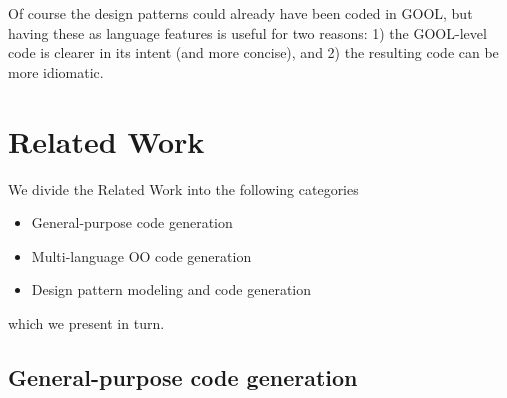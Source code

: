 \documentclass[sigplan,review,prologue,dvipsnames]{acmart}
\begin{document}
Of course the design patterns could already have been coded in GOOL, but
having these as language features is useful for two reasons: 1) the GOOL-level
code is clearer in its intent (and more concise), and 2) the resulting code
can be more idiomatic.

\section{Related Work} \label{sec:related}

We divide the Related Work into the following categories
\begin{itemize}
\item General-purpose code generation
\item Multi-language OO code generation
\item Design pattern modeling and code generation
\end{itemize}
which we present in turn.

\subsection{General-purpose code generation}
\end{document}
